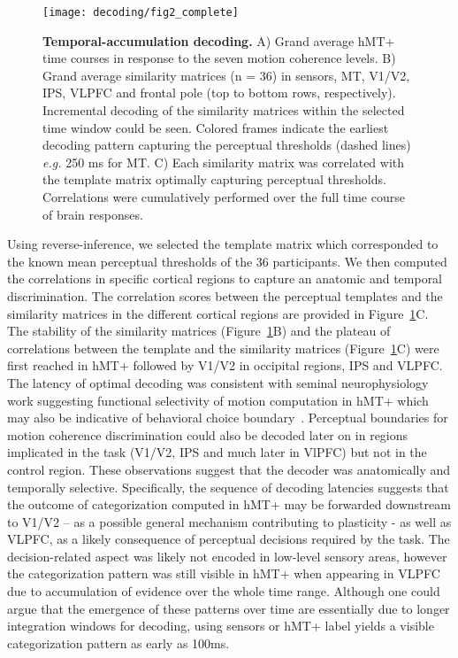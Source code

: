 \begin{figure}
\centering
	\texttt{[image: decoding/fig2\_complete]}
    \caption{{\bf Temporal-accumulation decoding.} A) Grand average hMT+ time courses in response to the seven motion coherence levels. B) Grand average similarity matrices (n = 36) in sensors, MT, V1/V2,  IPS, VLPFC and frontal pole (top to bottom rows, respectively). Incremental decoding of the similarity matrices within the selected time window could be seen. Colored frames indicate the earliest decoding pattern capturing the perceptual thresholds (dashed lines) \textit{e.g.} 250 ms for MT. C) Each similarity matrix was correlated with the template matrix optimally capturing perceptual thresholds. Correlations were cumulatively performed over the full time course of brain responses.}\label{fig:fig2}
\end{figure}


Using reverse-inference, we selected the template matrix which corresponded to the known mean perceptual thresholds of the 36 participants. We then computed the correlations in specific cortical regions to capture an anatomic and temporal discrimination. The correlation scores between the perceptual templates and the similarity matrices in the different cortical regions are provided in Figure~\ref{fig:fig2}C. The stability of the similarity matrices (Figure~\ref{fig:fig2}B) and the plateau of correlations between the template and the similarity matrices (Figure~\ref{fig:fig2}C) were first reached in hMT+ followed by V1/V2 in occipital regions, IPS and VLPFC. The latency of optimal decoding was consistent with seminal neurophysiology work suggesting functional selectivity of motion computation in hMT+ which may also be indicative of behavioral choice boundary~\cite{3jazayeri2006optimal,4rust2006mt,14serences2007representation,30britten1996relationship}. 
Perceptual boundaries for motion coherence discrimination could also be decoded later on in regions implicated in the task (V1/V2, IPS and much later in VlPFC) but not in the control region. These observations suggest that the decoder was anatomically and temporally selective. Specifically, the sequence of decoding latencies suggests that the outcome of categorization computed in hMT+ may be forwarded downstream to V1/V2 – as a possible general mechanism contributing to plasticity - as well as VLPFC, as a likely consequence of perceptual decisions required by the task. The decision-related aspect was likely not encoded in low-level sensory areas, however the categorization pattern was still visible in hMT+ when appearing in VLPFC due to accumulation of evidence over the whole time range. Although one could argue that the emergence of these patterns over time are essentially due to longer integration windows for decoding, using sensors or hMT+ label yields a visible categorization pattern as early as 100ms.


